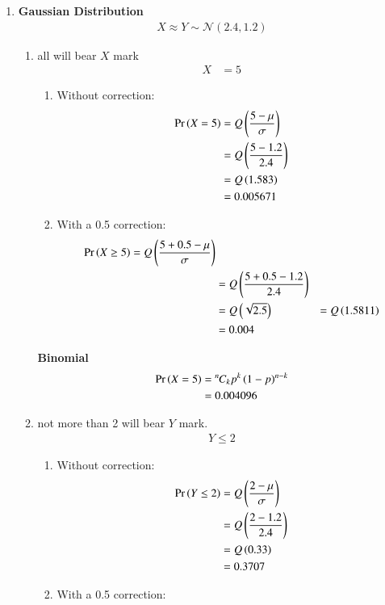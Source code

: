\documentclass[journal,12pt,twocolumn]{IEEEtran}
\theoremstyle{remark}
\begin{document}
\begin{enumerate}[label=(\roman*)]
\item 
\textbf{Gaussian Distribution}\\
\begin{align}
	X \approx Y \sim \mathcal{N}(2.4,1.2)
\end{align}
\begin{enumerate}[label=(\alph*)]
\item all will bear $X$ mark\\
\begin{align}
X &= 5
\end{align}
\begin{enumerate}
\item Without correction:
\begin{align}
\Pr\left(X =5\right) &= Q\left(\frac{5-\mu}{\sigma}\right) \\
&= Q\left(\frac{5-1.2}{2.4}\right) \\
&= Q\left(1.583\right) \\
& = 0.005671
\end{align}
\item With a 0.5 correction:
\begin{align}
\Pr\left(X \ge 5\right) = Q\left(\frac{5+0.5-\mu}{\sigma}\right) \\
 &= Q\left(\frac{5+0.5-1.2}{2.4}\right)\\
&= Q\left(\sqrt{2.5}\right) &= Q\left(1.5811\right) \\
&= 0.004 
\end{align}
\end{enumerate}
\textbf{Binomial}
\begin{align}
\Pr\left(X =5\right) &= {{}^{n}\mkern-1muC_{k}}p^k\left(1-p\right)^{n-k} \\
&= 0.004096
\end{align}
\item not more than 2 will bear $Y$ mark.\\
\begin{align}
Y \leq 2 
\end{align}
\begin{enumerate}
\item Without correction:
\begin{align}
\Pr\left(Y \leq 2\right) &= Q\left(\frac{2-\mu}{\sigma}\right) \\
&= Q\left(\frac{2-1.2}{2.4}\right) \\
&= Q\left(0.33\right) \\
& = 0.3707
\end{align}
\item With a 0.5 correction:
\begin{align}

\end{align}
\end{enumerate}
\end{enumerate}
\end{enumerate}
\end{document}

